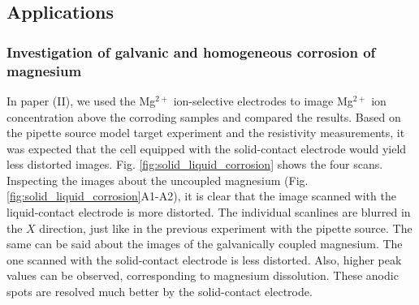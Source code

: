 		\subsection{Applications}
			\subsubsection{Investigation of galvanic and homogeneous corrosion of magnesium}
In paper (II), we used the Mg$^{2+}$ ion-selective electrodes to image Mg$^{2+}$ ion concentration above the corroding samples and compared the results.
Based on the pipette source model target experiment and the resistivity measurements, it was expected that the cell equipped with the solid-contact electrode would yield less distorted images.
Fig. \ref{fig:solid_liquid_corrosion} shows the four scans.
Inspecting the images about the uncoupled magnesium (Fig. \ref{fig:solid_liquid_corrosion}A1-A2), it is clear that the image scanned with the liquid-contact electrode is more distorted.
The individual scanlines are blurred in the $X$ direction, just like in the previous experiment with the pipette source.
The same can be said about the images of the galvanically coupled magnesium.
The one scanned with the solid-contact electrode is less distorted.
Also, higher peak values can be observed, corresponding to magnesium dissolution.
These anodic spots are resolved much better by the solid-contact electrode.

